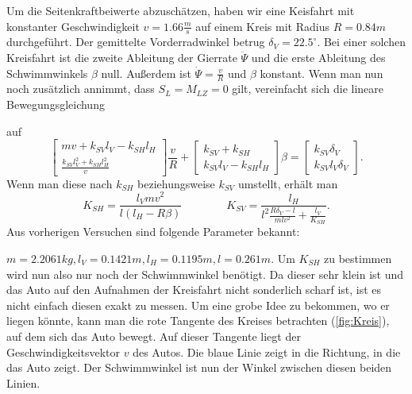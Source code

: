 Um die Seitenkraftbeiwerte abzuschätzen, haben wir eine Keisfahrt mit konstanter Geschwindigkeit $v=1.66\frac{m}{s}$ auf einem Kreis mit Radius $R=0.84m$ durchgeführt. Der gemittelte Vorderradwinkel betrug $\delta_V=22.5^\circ$. Bei einer solchen Kreisfahrt ist die zweite Ableitung der Gierrate $\ddot{\Psi}$ und die erste Ableitung des Schwimmwinkels $ \beta$ null. Außerdem ist $\dot{\Psi}=\frac{v}{R}$ und $\beta$ konstant. Wenn man nun noch zusätzlich annimmt, dass $S_L=M_{LZ}=0$ gilt, vereinfacht sich die lineare Bewegungsgleichung
\iffalse
$$ \begin{bmatrix} 
mv^2 & 0 \\
0 & I 
\end{bmatrix} 
\begin{bmatrix} 
\dot{\beta} \\
\ddot{\Psi}
\end{bmatrix}+ 
\begin{bmatrix} 
mv+k_{SV}l_V-k_{SH}l_{H} \\
\frac{k_{SV}l_V^2+k_{SH}l_H^2}{v}  
\end{bmatrix} \dot{\Psi}+
\begin{bmatrix} 
k_{SV}+k_{SH} \\
k_{SV}l_V-k_{SH}l_H 
\end{bmatrix} \beta=
\begin{bmatrix} 
S_L+k_{SV}\delta_v \\
M_{LZ}+k_{SV}l_V\delta_V 
\end{bmatrix}
$$
\fi
auf 
$$  
\begin{bmatrix} 
mv+k_{SV}l_V-k_{SH}l_{H} \\
\frac{k_{SV}l_V^2+k_{SH}l_H^2}{v}  
\end{bmatrix} \frac{v}{R}+
\begin{bmatrix} 
k_{SV}+k_{SH} \\
k_{SV}l_V-k_{SH}l_H 
\end{bmatrix} \beta=
\begin{bmatrix} 
k_{SV}\delta_V \\
k_{SV}l_V\delta_V 
\end{bmatrix}.
$$
Wenn man diese nach $k_{SH}$ beziehungsweise $k_{SV}$ umstellt, erhält man 
$$
K_{SH}=\frac{l_V mv^2}{l(l_H-R\beta)} \qquad \qquad K_{SV}=\frac{l_H}{l^2\frac{R\delta_V-l}{mlv^2}+\frac{l_V}{K_{SH}}}.
$$
Aus vorherigen Versuchen sind folgende Parameter bekannt:

$m=2.2061 kg,l_V=0.1421 m,l_H=0.1195 m,l=0.261 m$. Um $K_{SH}$ zu bestimmen wird nun also nur noch der Schwimmwinkel benötigt. Da dieser sehr klein ist und das Auto auf den Aufnahmen der Kreisfahrt nicht sonderlich scharf ist, ist es nicht einfach diesen exakt zu messen. Um eine grobe Idee zu bekommen, wo er liegen könnte, kann man die rote Tangente des Kreises betrachten (\ref{fig:Kreis}), auf dem sich das Auto bewegt. Auf dieser Tangente liegt der Geschwindigkeitsvektor $v$ des Autos. Die blaue Linie zeigt in die Richtung, in die das Auto zeigt. Der Schwimmwinkel ist nun der Winkel zwischen diesen beiden Linien. 

